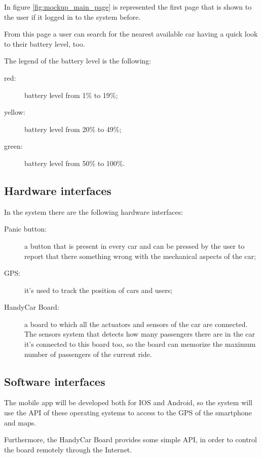 In figure \ref{fig:mockup_main_page} is represented the first page that is shown to the user if it logged in to the system before.

From this page a user can search for the nearest available car having a quick look to their battery level, too.

The legend of the battery level is the following:
\begin{description}
	\item[red:] battery level from 1\% to 19\%;
	\item[yellow:] battery level from 20\% to 49\%;
	\item[green:] battery level from 50\% to 100\%.
\end{description}



\subsection{Hardware interfaces}
In the system there are the following hardware interfaces:
\begin{description}
	\item [Panic button:] a button that is present in every car and can be pressed by the user to report that there something wrong with the mechanical aspects of the car;
	\item [GPS:] it's used to track the position of cars and users;
	\item [HandyCar Board:] a board to which all the actuators and sensors of the car are connected. The sensors system that detects how many passengers there are in the car it's connected to this board too, so the board can memorize the maximum number of passengers of the current ride.
\end{description}

\subsection{Software interfaces}
The mobile app will be developed both for IOS and Android, so the system will use the API of these operating systems to access to the GPS of the smartphone and maps.

Furthermore, the HandyCar Board provides some simple API, in order to control the board remotely through the Internet.




